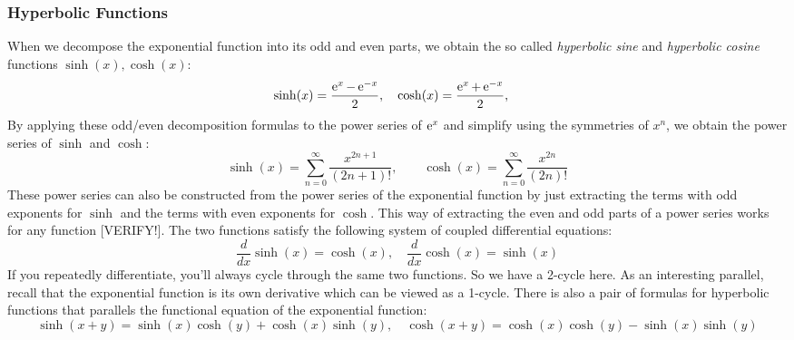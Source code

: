 






\subsubsection{Hyperbolic Functions}
When we decompose the exponential function into its odd and even parts, we obtain the so called \emph{hyperbolic sine} and \emph{hyperbolic cosine} functions $\sinh(x), \cosh(x)$:
\begin{equation}
\sinh(x) =	\frac{\operatorname{\mathrm{e}}^x - \operatorname{\mathrm{e}}^{-x}}{2}, \quad	
\cosh(x) =	\frac{\operatorname{\mathrm{e}}^x + \operatorname{\mathrm{e}}^{-x}}{2}, \quad
\end{equation}
By applying these odd/even decomposition formulas to the power series of $\operatorname{\mathrm{e}}^x$ and simplify using the symmetries of $x^n$, we obtain the power series of $\sinh$ and $\cosh$: 
\begin{equation}
\sinh(x) = \sum_{n=0}^{\infty} \frac{x^{2n+1}}{(2n+1)!}, \qquad
\cosh(x) = \sum_{n=0}^{\infty} \frac{x^{2n}  }{(2n)!}
\end{equation}
These power series can also be constructed from the power series of the exponential function by just extracting the terms with odd exponents for $\sinh$ and the terms with even exponents for $\cosh$. This way of extracting the even and odd parts of a power series works for any function [VERIFY!]. The two functions satisfy the following system of coupled differential equations:
\begin{equation}
\frac{d}{dx} \sinh(x) = \cosh(x), \quad
\frac{d}{dx} \cosh(x) = \sinh(x)
\end{equation} 
If you repeatedly differentiate, you'll always cycle through the same two functions. So we have a 2-cycle here. As an interesting parallel, recall that the exponential function is its own derivative which can be viewed as a 1-cycle. There is also a pair of formulas for hyperbolic functions that parallels the functional equation of the exponential function:
\begin{equation}
\sinh(x+y) = \sinh(x) \cosh(y) + \cosh(x) \sinh(y), \quad
\cosh(x+y) = \cosh(x) \cosh(y) - \sinh(x) \sinh(y)
\end{equation}


